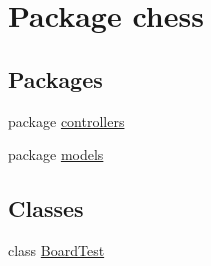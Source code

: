 \hypertarget{namespacechess}{}\section{Package chess}
\label{namespacechess}
\subsection*{Packages}
\begin{DoxyCompactItemize}
\item 
package \mbox{\hyperlink{namespacechess_1_1controllers}{controllers}}
\item 
package \mbox{\hyperlink{namespacechess_1_1models}{models}}
\end{DoxyCompactItemize}
\subsection*{Classes}
\begin{DoxyCompactItemize}
\item 
class \mbox{\hyperlink{classchess_1_1_board_test}{Board\+Test}}
\end{DoxyCompactItemize}
